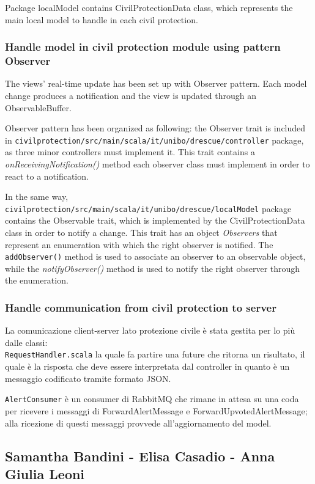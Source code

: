 \documentclass[a4paper,12pt]{report}
\begin{document}
Package localModel contains CivilProtectionData class, which represents the main local model to handle in each civil protection.


\subsubsection{Handle model in civil protection module using pattern Observer}

The views' real-time update has been set up with Observer pattern. Each model change produces a notification and the view is updated through an ObservableBuffer.

Observer pattern has been organized as following: the Observer trait is included in \texttt{civilprotection/src/main/scala/it/unibo/drescue/controller} package, as three minor controllers must implement it. This trait contains a \textit{onReceivingNotification()} method each observer class must implement in order to react to a notification.

In the same way, \texttt{civilprotection/src/main/scala/it/unibo/drescue/localModel} package contains the Observable trait, which is implemented by the CivilProtectionData class in order to notify a change. This trait has an object \textit{Observers} that represent an enumeration with which the right observer is notified. The \texttt{addObserver()} method is used to associate an observer to an observable object, while the \textit{notifyObserver()} method is used to notify the right observer through the enumeration.

\subsubsection{Handle communication from civil protection to server}
La comunicazione client-server lato protezione civile è stata gestita per lo più dalle classi:\\

\texttt{RequestHandler.scala} la quale fa partire una future che ritorna un risultato, il quale è la risposta che deve essere interpretata dal controller in quanto è un messaggio codificato tramite formato JSON.


\texttt{AlertConsumer} è un consumer di RabbitMQ che rimane in attesa su una coda per ricevere i messaggi di ForwardAlertMessage e ForwardUpvotedAlertMessage; alla ricezione di questi messaggi provvede all'aggiornamento del model.\\

\subsection{Samantha Bandini - Elisa Casadio - Anna Giulia Leoni}
\end{document}

